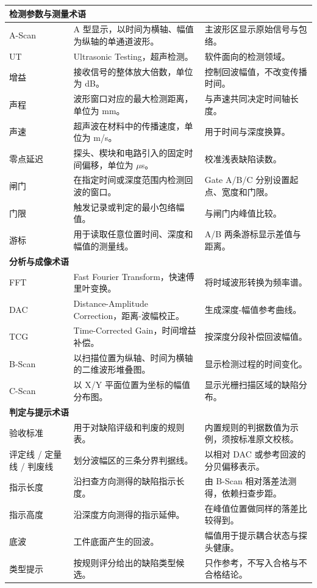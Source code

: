 \begin{longtable}{p{}p{}p{}}
	\multicolumn{3}{l}{\textbf{检测参数与测量术语}} \\
	\midrule
	A-Scan & A 型显示，以时间为横轴、幅值为纵轴的单通道波形。 & 主波形区显示原始信号与包络。 \\
	UT & Ultrasonic Testing，超声检测。 & 软件面向的检测领域。 \\
	增益 & 接收信号的整体放大倍数，单位为 dB。 & 控制回波幅值，不改变传播时间。 \\
	声程 & 波形窗口对应的最大检测距离，单位为 mm。 & 与声速共同决定时间轴长度。 \\
	声速 & 超声波在材料中的传播速度，单位为 m/s。 & 用于时间与深度换算。 \\
	零点延迟 & 探头、楔块和电路引入的固定时间偏移，单位为 $\mu$s。 & 校准浅表缺陷读数。 \\
	闸门 & 在指定时间或深度范围内检测回波的窗口。 & Gate A/B/C 分别设置起点、宽度和门限。 \\
	门限 & 触发记录或判定的最小包络幅值。 & 与闸门内峰值比较。 \\
	游标 & 用于读取任意位置时间、深度和幅值的测量线。 & A/B 两条游标显示差值与距离。 \\
	\midrule

	\multicolumn{3}{l}{\textbf{分析与成像术语}} \\
	\midrule
	FFT & Fast Fourier Transform，快速傅里叶变换。 & 将时域波形转换为频率谱。 \\
	DAC & Distance-Amplitude Correction，距离-波幅校正。 & 生成深度-幅值参考曲线。 \\
	TCG & Time-Corrected Gain，时间增益补偿。 & 按深度分段补偿回波幅值。 \\
	B-Scan & 以扫描位置为纵轴、时间为横轴的二维波形堆叠图。 & 显示检测过程的时间变化。 \\
	C-Scan & 以 X/Y 平面位置为坐标的幅值分布图。 & 显示光栅扫描区域的缺陷分布。 \\
	\midrule

	\multicolumn{3}{l}{\textbf{判定与提示术语}} \\
	\midrule
	验收标准 & 用于对缺陷评级和判废的规则表。 & 内置规则的判据数值为示例，须按标准原文校核。 \\
	评定线 / 定量线 / 判废线 & 划分波幅区的三条分界判据线。 & 以相对 DAC 或参考回波的分贝偏移表示。 \\
	指示长度 & 沿扫查方向测得的缺陷指示长度。 & 由 B-Scan 相对落差法测得，依赖扫查步距。 \\
	指示高度 & 沿深度方向测得的指示延伸。 & 在峰值位置做同样的落差比较得到。 \\
	底波 & 工件底面产生的回波。 & 幅值用于提示耦合状态与探头健康。 \\
	类型提示 & 按规则评分给出的缺陷类型候选。 & 只作参考，不写入合格与不合格结论。 \\
\end{longtable}
